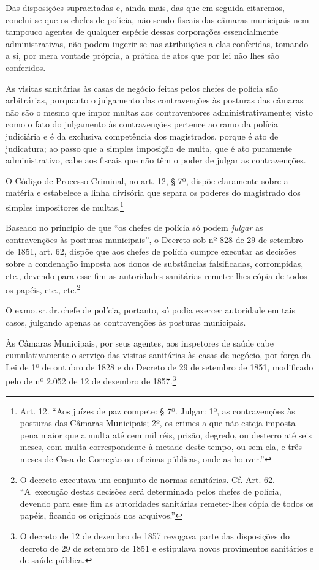 Das disposições supracitadas e, ainda mais, das que em seguida
citaremos, conclui-se que os chefes de polícia, não sendo fiscais das
câmaras municipais nem tampouco agentes de qualquer espécie dessas
corporações essencialmente administrativas, não podem ingerir-se nas
atribuições a elas conferidas, tomando a si, por mera vontade própria, a
prática de atos que por lei não lhes são conferidos.

As visitas sanitárias às casas de negócio feitas pelos chefes de polícia
são arbitrárias, porquanto o julgamento das contravenções às posturas
das câmaras não são o mesmo que impor multas aos contraventores
administrativamente; visto como o fato do julgamento às contravenções
pertence ao ramo da polícia judiciária e é da exclusiva competência dos
magistrados, porque é ato de judicatura; ao passo que a simples
imposição de multa, que é ato puramente administrativo, cabe aos fiscais
que não têm o poder de julgar as contravenções.

O Código de Processo Criminal, no art. 12, § 7º, dispõe claramente sobre
a matéria e estabelece a linha divisória que separa os poderes do
magistrado dos simples impositores de multas.\footnote{Art. 12. ``Aos
  juízes de paz compete:
  § 7º. Julgar: 1º, as contravenções às posturas das Câmaras Municipais;
  2º, os crimes a que não esteja imposta pena maior que a multa até cem
  mil réis, prisão, degredo, ou desterro até seis meses, com multa
  correspondente à metade deste tempo, ou sem ela, e três meses de Casa
  de Correção ou oficinas públicas, onde as houver.''}

Baseado no princípio de que ``os chefes de polícia só podem \emph{julgar}
as contravenções às posturas municipais'', o Decreto sob nº 828 de 29 de
setembro de 1851, art. 62, dispõe que aos chefes de polícia cumpre
executar as decisões sobre a condenação imposta aos donos de substâncias
falsificadas, corrompidas, etc., devendo para esse fim as autoridades
sanitárias remeter-lhes cópia de todos os papéis, etc., etc.\footnote{
  O decreto executava um conjunto de normas sanitárias. Cf. Art. 62. ``A~execução destas decisões será determinada pelos chefes de polícia,
  devendo para esse fim as autoridades sanitárias remeter-lhes cópia de
  todos os papéis, ficando os originais nos arquivos.''}

O exmo.\,sr.\,dr.\,chefe de polícia, portanto, só podia exercer autoridade
em tais casos, julgando apenas as contravenções às posturas municipais.

Às Câmaras Municipais, por seus agentes, aos inspetores de saúde cabe
cumulativamente o serviço das visitas sanitárias às casas de negócio,
por força da Lei de 1º de outubro de 1828 e do Decreto de 29 de setembro
de 1851, modificado pelo de nº 2.052 de 12 de dezembro de
1857.\footnote{O decreto de 12 de dezembro de 1857 revogava parte das disposições
  do decreto de 29 de setembro de 1851 e estipulava novos provimentos sanitários e
  de saúde pública.}

